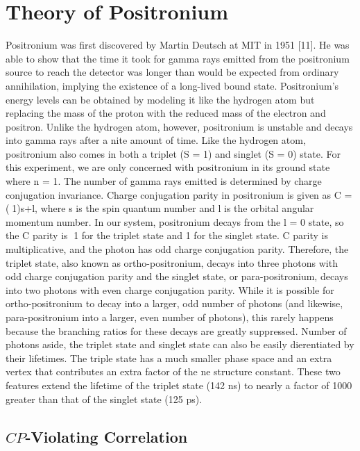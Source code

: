 \section{Theory of Positronium}
Positronium was first discovered by Martin Deutsch at MIT in 1951 [11]. He was able to show that the time
it took for gamma rays emitted from the positronium source to reach the detector was longer than would be
expected from ordinary annihilation, implying the existence of a long-lived bound state.
Positronium's energy levels can be obtained by modeling it like the hydrogen atom but replacing the
mass of the proton with the reduced mass of the electron and positron. Unlike the hydrogen atom, however,
positronium is unstable and decays into gamma rays after a nite amount of time. Like the hydrogen atom,
positronium also comes in both a triplet (S = 1) and singlet (S = 0) state. For this experiment, we are only
concerned with positronium in its ground state where n = 1.
The number of gamma rays emitted is determined by charge conjugation invariance. Charge conjugation
parity in positronium is given as C = (􀀀1)s+l, where s is the spin quantum number and l is the orbital
angular momentum number. In our system, positronium decays from the l = 0 state, so the C parity is
􀀀1 for the triplet state and 1 for the singlet state. C parity is multiplicative, and the photon has odd
charge conjugation parity. Therefore, the triplet state, also known as ortho-positronium, decays into three
photons with odd charge conjugation parity and the singlet state, or para-positronium, decays into two
photons with even charge conjugation parity. While it is possible for ortho-positronium to decay into a
larger, odd number of photons (and likewise, para-positronium into a larger, even number of photons), this
rarely happens because the branching ratios for these decays are greatly suppressed.
Number of photons aside, the triplet state and singlet state can also be easily dierentiated by their
lifetimes. The triple state has a much smaller phase space and an extra vertex that contributes an extra
factor of the ne structure constant. These two features extend the lifetime of the triplet state (142 ns) to
nearly a factor of 1000 greater than that of the singlet state (125 ps).



\subsection{$CP$-Violating Correlation}

